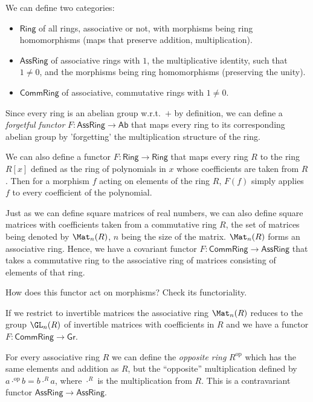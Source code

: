 We can define two categories:
\begin{itemize}
    \item $\mathsf{Ring}$ of all rings, associative or not, with morphisms
    being ring homomorphisms (maps that preserve addition, multiplication).
    \item $\mathsf{AssRing}$ of associative rings with $1$, the multiplicative
    identity, such that $1\neq0$, and the morphisms being ring homomorphisms
    (preserving the unity).
    \item $\mathsf{CommRing}$ of associative, commutative rings with $1\neq0$. 
\end{itemize}
\begin{example}
    Since every ring is an abelian group w.r.t.\ $+$ by definition,
    we can define a \emph{forgetful functor} $F:\mathsf{AssRing}\rightarrow\mathsf{Ab}$
    that maps every ring to its corresponding abelian group by 'forgetting'
    the multiplication structure of the ring.
\end{example}
%
\begin{example}
    We can also define a functor $F:\mathsf{Ring}\rightarrow\mathsf{Ring}$
    that maps every ring $R$ to the ring $R[x]$ defined as the ring
    of polynomials in $x$ whose coefficients are taken from $R$. Then
    for a morphism $f$ acting on elements of the ring $R$, $F\left(f\right)$
    simply applies $f$ to every coefficient of the polynomial.
\end{example}
%
\begin{example}
    Just as we can define square matrices of real numbers, we can also
    define square matrices with coefficients taken from a commutative
    ring $R$, the set of matrices being denoted by $\Mat_n(R)$,
    $n$ being the size of the matrix. $\Mat_n(R)$ forms an associative
    ring. Hence, we have a covariant functor $F:\mathsf{CommRing}\rightarrow\mathsf{AssRing}$
    that takes a commutative ring to the associative ring of matrices consisting of elements of that ring. 
\end{example}
\begin{xca}
    How does this functor act on morphisms? Check its functoriality.
\end{xca}
\begin{example}
    If we restrict to invertible matrices the associative ring $\Mat_n(R)$
    reduces to the group $\GL_n(R)$ of invertible matrices with
    coefficients in $R$ and we have a functor $F:\mathsf{CommRing}\rightarrow\mathsf{Gr}$.
\end{example}
%
\begin{example}
    For every associative ring $R$ we can define the \emph{opposite
    ring} $R^{\mathrm{op}}$ which has the same elements and addition as
    $R$, but the ``opposite'' multiplication defined by $a\cdot^{\mathrm{op}}b=b\cdot^{R}a$,
    where $\cdot^{R}$ is the multiplication from $R$. This is a contravariant
    functor $\mathsf{AssRing}\to\mathsf{AssRing}$.
\end{example}


